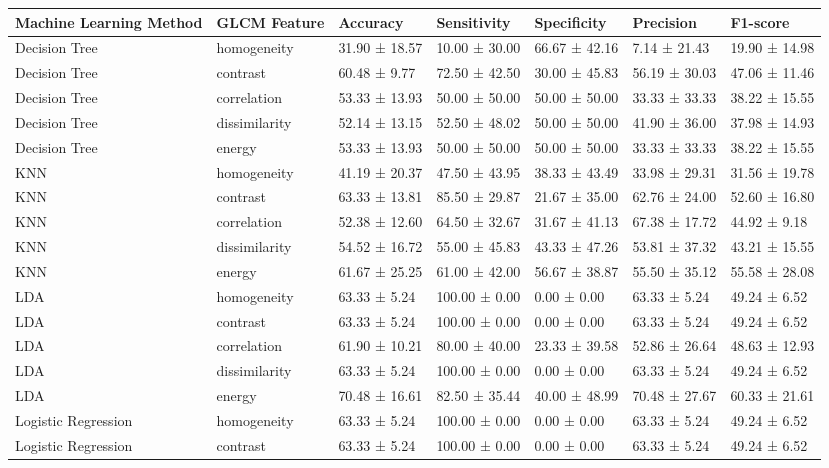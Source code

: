 \begin{tabular}{lllllll}
\toprule
Machine Learning Method & GLCM Feature & Accuracy & Sensitivity & Specificity & Precision & F1-score \\
\midrule
Decision Tree & homogeneity & 31.90 ± 18.57 & 10.00 ± 30.00 & 66.67 ± 42.16 & 7.14 ± 21.43 & 19.90 ± 14.98 \\
Decision Tree & contrast & 60.48 ± 9.77 & 72.50 ± 42.50 & 30.00 ± 45.83 & 56.19 ± 30.03 & 47.06 ± 11.46 \\
Decision Tree & correlation & 53.33 ± 13.93 & 50.00 ± 50.00 & 50.00 ± 50.00 & 33.33 ± 33.33 & 38.22 ± 15.55 \\
Decision Tree & dissimilarity & 52.14 ± 13.15 & 52.50 ± 48.02 & 50.00 ± 50.00 & 41.90 ± 36.00 & 37.98 ± 14.93 \\
Decision Tree & energy & 53.33 ± 13.93 & 50.00 ± 50.00 & 50.00 ± 50.00 & 33.33 ± 33.33 & 38.22 ± 15.55 \\
KNN & homogeneity & 41.19 ± 20.37 & 47.50 ± 43.95 & 38.33 ± 43.49 & 33.98 ± 29.31 & 31.56 ± 19.78 \\
KNN & contrast & 63.33 ± 13.81 & 85.50 ± 29.87 & 21.67 ± 35.00 & 62.76 ± 24.00 & 52.60 ± 16.80 \\
KNN & correlation & 52.38 ± 12.60 & 64.50 ± 32.67 & 31.67 ± 41.13 & 67.38 ± 17.72 & 44.92 ± 9.18 \\
KNN & dissimilarity & 54.52 ± 16.72 & 55.00 ± 45.83 & 43.33 ± 47.26 & 53.81 ± 37.32 & 43.21 ± 15.55 \\
KNN & energy & 61.67 ± 25.25 & 61.00 ± 42.00 & 56.67 ± 38.87 & 55.50 ± 35.12 & 55.58 ± 28.08 \\
LDA & homogeneity & 63.33 ± 5.24 & 100.00 ± 0.00 & 0.00 ± 0.00 & 63.33 ± 5.24 & 49.24 ± 6.52 \\
LDA & contrast & 63.33 ± 5.24 & 100.00 ± 0.00 & 0.00 ± 0.00 & 63.33 ± 5.24 & 49.24 ± 6.52 \\
LDA & correlation & 61.90 ± 10.21 & 80.00 ± 40.00 & 23.33 ± 39.58 & 52.86 ± 26.64 & 48.63 ± 12.93 \\
LDA & dissimilarity & 63.33 ± 5.24 & 100.00 ± 0.00 & 0.00 ± 0.00 & 63.33 ± 5.24 & 49.24 ± 6.52 \\
LDA & energy & 70.48 ± 16.61 & 82.50 ± 35.44 & 40.00 ± 48.99 & 70.48 ± 27.67 & 60.33 ± 21.61 \\
Logistic Regression & homogeneity & 63.33 ± 5.24 & 100.00 ± 0.00 & 0.00 ± 0.00 & 63.33 ± 5.24 & 49.24 ± 6.52 \\
Logistic Regression & contrast & 63.33 ± 5.24 & 100.00 ± 0.00 & 0.00 ± 0.00 & 63.33 ± 5.24 & 49.24 ± 6.52 \\

\end{tabular}
